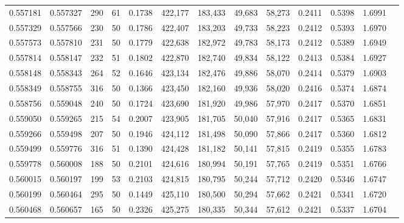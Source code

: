 \begin{tabular}{rrrrrrrrrrrrr}
0.557181 & 0.557327 &   290 &  61 &                                     0.1738 & 422,177 & 183,433 &  49,683 &  58,273 & 0.2411 & 0.5398 & 1.6991 \\
0.557329 & 0.557566 &   230 &  50 &                                     0.1786 & 422,407 & 183,203 &  49,733 &  58,223 & 0.2412 & 0.5393 & 1.6970 \\
0.557573 & 0.557810 &   231 &  50 &                                     0.1779 & 422,638 & 182,972 &  49,783 &  58,173 & 0.2412 & 0.5389 & 1.6949 \\
0.557814 & 0.558147 &   232 &  51 &                                     0.1802 & 422,870 & 182,740 &  49,834 &  58,122 & 0.2413 & 0.5384 & 1.6927 \\
0.558148 & 0.558343 &   264 &  52 &                                     0.1646 & 423,134 & 182,476 &  49,886 &  58,070 & 0.2414 & 0.5379 & 1.6903 \\
0.558349 & 0.558755 &   316 &  50 &                                     0.1366 & 423,450 & 182,160 &  49,936 &  58,020 & 0.2416 & 0.5374 & 1.6874 \\
0.558756 & 0.559048 &   240 &  50 &                                     0.1724 & 423,690 & 181,920 &  49,986 &  57,970 & 0.2417 & 0.5370 & 1.6851 \\
0.559050 & 0.559265 &   215 &  54 &                                     0.2007 & 423,905 & 181,705 &  50,040 &  57,916 & 0.2417 & 0.5365 & 1.6831 \\
0.559266 & 0.559498 &   207 &  50 &                                     0.1946 & 424,112 & 181,498 &  50,090 &  57,866 & 0.2417 & 0.5360 & 1.6812 \\
0.559499 & 0.559776 &   316 &  51 &                                     0.1390 & 424,428 & 181,182 &  50,141 &  57,815 & 0.2419 & 0.5355 & 1.6783 \\
0.559778 & 0.560008 &   188 &  50 &                                     0.2101 & 424,616 & 180,994 &  50,191 &  57,765 & 0.2419 & 0.5351 & 1.6766 \\
0.560015 & 0.560197 &   199 &  53 &                                     0.2103 & 424,815 & 180,795 &  50,244 &  57,712 & 0.2420 & 0.5346 & 1.6747 \\
0.560199 & 0.560464 &   295 &  50 &                                     0.1449 & 425,110 & 180,500 &  50,294 &  57,662 & 0.2421 & 0.5341 & 1.6720 \\
0.560468 & 0.560657 &   165 &  50 &                                     0.2326 & 425,275 & 180,335 &  50,344 &  57,612 & 0.2421 & 0.5337 & 1.6704 \\

\end{tabular}
